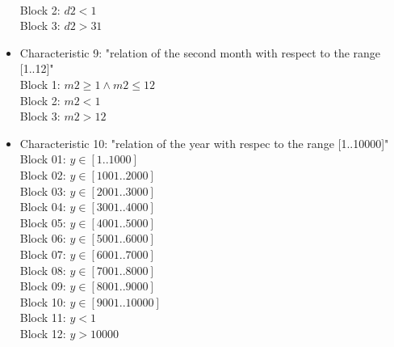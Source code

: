 \documentclass[12pt,a4paper]{article}
\begin{document}
\begin{itemize}
\\Block 2: $d2 < 1$
\\Block 3: $d2 > 31$
\item Characteristic 9: "relation of the second month with respect to the range [1..12]"
\\Block 1: $m2 \geq 1 \land m2 \leq 12$
\\Block 2: $m2 < 1$
\\Block 3: $m2 > 12$
\item Characteristic 10: "relation of the year with respec to the range [1..10000]"
\\Block 01: $y \in [1..1000]$
\\Block 02: $y \in [1001..2000]$
\\Block 03: $y \in [2001..3000]$
\\Block 04: $y \in [3001..4000]$
\\Block 05: $y \in [4001..5000]$
\\Block 06: $y \in [5001..6000]$
\\Block 07: $y \in [6001..7000]$
\\Block 08: $y \in [7001..8000]$
\\Block 09: $y \in [8001..9000]$
\\Block 10: $y \in [9001..10000]$
\\Block 11: $y < 1$
\\Block 12: $y > 10000$
\end{itemize}
\end{document}
